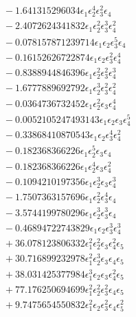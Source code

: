 \documentclass[10pt]{article}
\begin{document}
\begin{align*}
&{}  - 1.641315296034 \epsilon_{1} \epsilon_{2}^{4} \epsilon_{3}^{2} \epsilon_{4} \\
&{}  - 2.4072624341832 \epsilon_{1} \epsilon_{2}^{2} \epsilon_{3}^{3} \epsilon_{4}^{2} \\
&{}  - 0.078157871239714 \epsilon_{1} \epsilon_{2} \epsilon_{3}^{5} \epsilon_{4} \\
&{}  - 0.16152626722874 \epsilon_{1} \epsilon_{2} \epsilon_{3}^{2} \epsilon_{4}^{4} \\
&{}  - 0.8388944846396 \epsilon_{1} \epsilon_{2}^{2} \epsilon_{3}^{2} \epsilon_{4}^{3} \\
&{}  - 1.6777889692792 \epsilon_{1} \epsilon_{2}^{3} \epsilon_{3}^{2} \epsilon_{4}^{2} \\
&{}  - 0.0364736732452 \epsilon_{1} \epsilon_{2}^{2} \epsilon_{3} \epsilon_{4}^{4} \\
&{}  - 0.0052105247493143 \epsilon_{1} \epsilon_{2} \epsilon_{3} \epsilon_{4}^{5} \\
&{}  - 0.33868410870543 \epsilon_{1} \epsilon_{2} \epsilon_{3}^{4} \epsilon_{4}^{2} \\
&{}  - 0.182368366226 \epsilon_{1} \epsilon_{2}^{5} \epsilon_{3} \epsilon_{4} \\
&{}  - 0.182368366226 \epsilon_{1} \epsilon_{2}^{4} \epsilon_{3} \epsilon_{4}^{2} \\
&{}  - 0.1094210197356 \epsilon_{1} \epsilon_{2}^{3} \epsilon_{3} \epsilon_{4}^{3} \\
&{}  - 1.7507363157696 \epsilon_{1} \epsilon_{2}^{2} \epsilon_{3}^{4} \epsilon_{4} \\
&{}  - 3.5744199780296 \epsilon_{1} \epsilon_{2}^{3} \epsilon_{3}^{3} \epsilon_{4} \\
&{}  - 0.46894722743829 \epsilon_{1} \epsilon_{2} \epsilon_{3}^{3} \epsilon_{4}^{3} \\
&{}  + 36.078123806332 \epsilon_{1}^{2} \epsilon_{2}^{2} \epsilon_{3} \epsilon_{4}^{2} \epsilon_{5} \\
&{}  + 30.716899232978 \epsilon_{1}^{2} \epsilon_{2}^{3} \epsilon_{3} \epsilon_{4} \epsilon_{5} \\
&{}  + 38.031425377984 \epsilon_{1}^{3} \epsilon_{2} \epsilon_{3} \epsilon_{4}^{2} \epsilon_{5} \\
&{}  + 77.176250694699 \epsilon_{1}^{2} \epsilon_{2}^{2} \epsilon_{3}^{2} \epsilon_{4} \epsilon_{5} \\
&{}  + 9.7475654550832 \epsilon_{1}^{2} \epsilon_{2} \epsilon_{3}^{2} \epsilon_{4} \epsilon_{5}^{2} \\

\end{align*}
\end{document}
